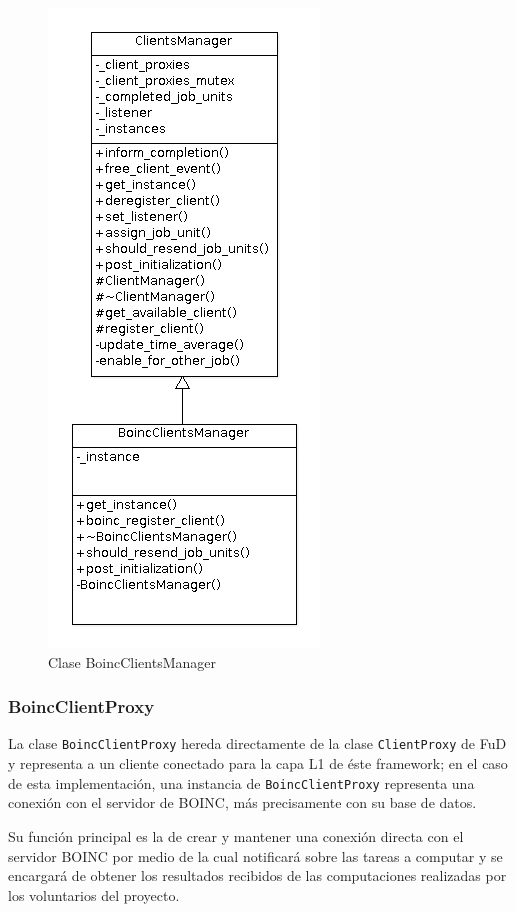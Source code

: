 \begin{figure}[H]
	\begin{center}
  		\includegraphics[scale=0.65]{images/BoincClientsManager.png}
		\caption{Clase BoincClientsManager}
		\label{fig:BoincClientsManager}
		\end{center}
\end{figure} 


\subsubsection{BoincClientProxy}

La clase \texttt{BoincClientProxy} hereda directamente de la clase \texttt{ClientProxy} de FuD y representa a un cliente conectado para la capa L1 de éste framework; en el caso de esta implementación, una instancia de \texttt{BoincClientProxy} representa una conexión con el servidor de BOINC, más precisamente con su base de datos.

Su función principal es la de crear y mantener una conexión directa con el servidor BOINC por medio de la cual notificará sobre las tareas a computar y se encargará de obtener los resultados recibidos de las computaciones realizadas por los voluntarios del proyecto. 

